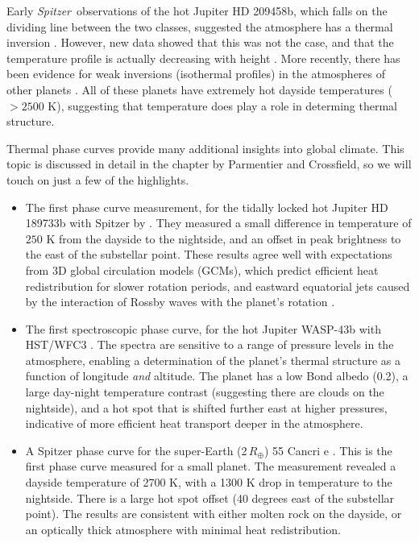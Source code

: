 \documentclass[graybox,natbib,nosecnum]{svmult}
\newcommand{\hbindex}[1]{\hl{#1}\index{#1}}  %
\newcommand{\project}[1]{\textsl{#1}}
\newcommand{\Spitzer}{\project{Spitzer}}
\begin{document}
Early \Spitzer\ observations of the hot Jupiter HD 209458b, which falls on the dividing line between the two classes, suggested the atmosphere has a thermal inversion \citep{knutson08}. 
However, new data showed that this was not the case, and that the temperature profile is actually decreasing with height \citep{diamond-lowe14, schwarz15, line16}.  More recently, there has been evidence for weak inversions (isothermal profiles) in the atmospheres of other planets \citep{stevenson14, haynes15}. All of these planets have extremely hot dayside temperatures ($> 2500$ K), suggesting that temperature does play a role in determing thermal structure. %

Thermal phase curves provide many additional insights into global climate. This topic is discussed in detail in the chapter by Parmentier and Crossfield, so we will touch on just a few of the highlights. 
\begin{itemize}
\item{The first phase curve measurement, for the tidally locked hot Jupiter HD 189733b with Spitzer by \cite{knutson07}. They measured a small difference in temperature of $250$ K from the dayside to the nightside, and an offset in peak brightness to the east of the substellar point. These results agree well with expectations from 3D global circulation models (GCMs), which predict efficient heat redistribution for slower rotation periods, and eastward equatorial jets caused by the interaction of Rossby waves with the planet's rotation \citep{showman09}.}
\item{The first spectroscopic phase curve, for the hot Jupiter WASP-43b with HST/WFC3 \citep{stevenson14}. The spectra are sensitive to a range of pressure levels in the atmosphere, enabling a determination of the planet's thermal structure as a function of longitude \emph{and} altitude. The planet has a low Bond albedo (0.2), a large day-night temperature contrast (suggesting there are clouds on the nightside), and a hot spot that is shifted further east at higher pressures, indicative of more efficient heat transport deeper in the atmosphere.}
\item{A Spitzer phase curve for the super-Earth (2\,$R_\oplus$) 55 Cancri e \citep{demory16}.  This is the first phase curve measured for a small planet.  The measurement revealed a dayside temperature of 2700 K, with a 1300 K drop in temperature to the nightside. There is a large hot spot offset (40 degrees east of the substellar point).  The results are consistent with either molten rock on the dayside, or an optically thick atmosphere with minimal heat redistribution.}
\end{itemize}
\end{document}
